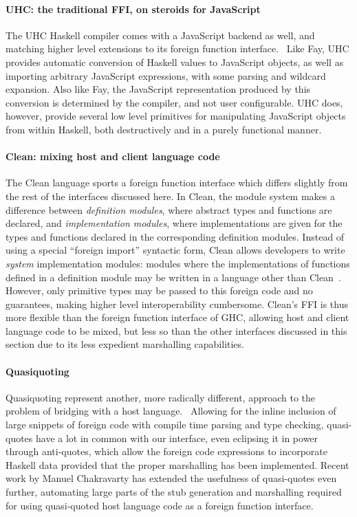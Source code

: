 \documentclass[preprint]{sigplanconf}
\begin{document}
\paragraph{UHC: the traditional FFI, on steroids for JavaScript}
The UHC Haskell compiler comes with a JavaScript backend as well, and matching
higher level extensions to its foreign function interface.\ \cite{uhc}
Like Fay, UHC provides automatic conversion of Haskell values to JavaScript
objects, as well as importing arbitrary JavaScript expressions, with some
parsing and wildcard expansion.
Also like Fay, the JavaScript representation produced by this
conversion is determined by the compiler, and not user configurable.
UHC does, however, provide several low level primitives for manipulating
JavaScript objects from within Haskell, both destructively and in a purely
functional manner.

\paragraph{Clean: mixing host and client language code}
The Clean language sports a foreign function interface which differs slightly
from the rest of the interfaces discussed here. In Clean, the module system
makes a difference between \emph{definition modules}, where abstract types and
functions are declared, and \emph{implementation modules}, where implementations
are given for the types and functions declared in the corresponding definition
modules.
Instead of using a special ``foreign import'' syntactic form, Clean allows
developers to write \emph{system} implementation modules: modules where the
implementations of functions defined in a definition module may be written in
a language other than Clean\ \cite{clean}. However, only primitive types may
be passed to this foreign code and no guarantees, making higher level
interoperability cumbersome.
Clean's FFI is thus more flexible than the foreign function interface of GHC,
allowing host and client language code to be mixed, but less so than the other
interfaces discussed in this section due to its less expedient marshalling
capabilities.

\paragraph{Quasiquoting}
Quasiquoting represent another, more radically different, approach to the
problem of bridging with a host language.\ \cite{quasiquotes}
Allowing for the inline inclusion of large snippets of foreign code with
compile time parsing and type checking,
quasi-quotes have a lot in common with our interface, even eclipsing it in
power through anti-quotes, which allow the foreign code expressions to
incorporate Haskell data provided that the proper marshalling has been
implemented. Recent work by Manuel Chakravarty has extended the usefulness of
quasi-quotes even further, automating large parts of the stub generation
and marshalling required for using quasi-quoted host language code as a
foreign function interface.\ \cite{language-c-inline}
\end{document}
